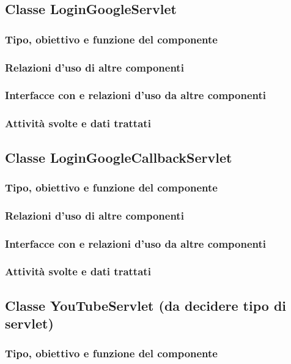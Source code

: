 \subsection{Classe LoginGoogleServlet}
\subsubsection*{Tipo, obiettivo e funzione del componente}
\subsubsection*{Relazioni d'uso di altre componenti}
\subsubsection*{Interfacce con e relazioni d'uso da altre componenti}
\subsubsection*{Attivit\`a svolte e dati trattati}

\subsection{Classe LoginGoogleCallbackServlet}
\subsubsection*{Tipo, obiettivo e funzione del componente}
\subsubsection*{Relazioni d'uso di altre componenti}
\subsubsection*{Interfacce con e relazioni d'uso da altre componenti}
\subsubsection*{Attivit\`a svolte e dati trattati}

\subsection{Classe YouTubeServlet (da decidere tipo di servlet)}
\subsubsection*{Tipo, obiettivo e funzione del componente}
